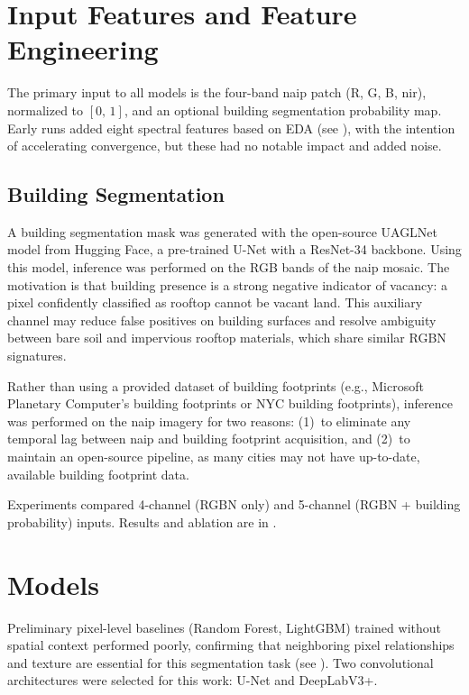 \section{Input Features and Feature Engineering}
\label{sec:features}

The primary input to all models is the four-band \acrshort{naip} patch (R, G, B, \acrshort{nir}), normalized to $[0,\,1]$, and an optional building segmentation probability map. Early runs added eight spectral features based on EDA (see ), with the intention of accelerating convergence, but these had no notable impact and added noise.

\subsection{Building Segmentation}
\label{sec:building_seg}

A building segmentation mask was generated with the open-source UAGLNet model from Hugging Face, a pre-trained U-Net with a ResNet-34 backbone. Using this model, inference was performed on the RGB bands of the \acrshort{naip} mosaic. The motivation is that building presence is a strong negative indicator of vacancy: a pixel confidently classified as rooftop cannot be vacant land. This auxiliary channel may reduce false positives on building surfaces and resolve ambiguity between bare soil and impervious rooftop materials, which share similar RGBN signatures.

Rather than using a provided dataset of building footprints (e.g., Microsoft Planetary Computer's building footprints or NYC building footprints), inference was performed on the \acrshort{naip} imagery for two reasons: (1)~to eliminate any temporal lag between \acrshort{naip} and building footprint acquisition, and (2)~to maintain an open-source pipeline, as many cities may not have up-to-date, available building footprint data.

Experiments compared 4-channel (RGBN only) and 5-channel (RGBN + building probability) inputs. Results and ablation are in .

\section{Models}
\label{sec:models}

Preliminary pixel-level baselines (Random Forest, LightGBM) trained without spatial context performed poorly, confirming that neighboring pixel relationships and texture are essential for this segmentation task (see ). Two convolutional architectures were selected for this work: U-Net and DeepLabV3+.

